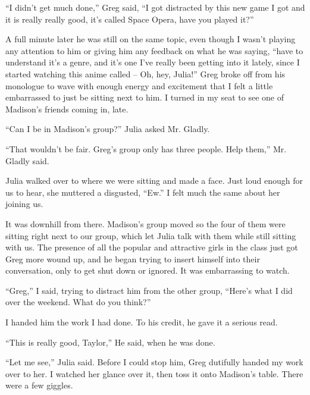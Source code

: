 ``I didn't get much done,'' Greg said, ``I got distracted by this new game I got and it is really really good, it's called Space Opera, have you played it?''



A full minute later he was still on the same topic, even though I wasn't playing any attention to him or giving him any feedback on what he was saying, ``\ldotsyou have to understand it's a genre, and it's one I've really been getting into it lately, since I started watching this anime called – Oh, hey, Julia!''  Greg broke off from his monologue to wave with enough energy and excitement that I felt a little embarrassed to just be sitting next to him.  I turned in my seat to see one of Madison's friends coming in, late.



``Can I be in Madison's group?'' Julia asked Mr. Gladly.



``That wouldn't be fair.  Greg's group only has three people.  Help them,'' Mr. Gladly said.



Julia walked over to where we were sitting and made a face.  Just loud enough for us to hear, she muttered a disgusted, ``Ew.''  I felt much the same about her joining us.



It was downhill from there.  Madison's group moved so the four of them were sitting right next to our group, which let Julia talk with them while still sitting with us.  The presence of all the popular and attractive girls in the class just got Greg more wound up, and he began trying to insert himself into their conversation, only to get shut down or ignored.  It was embarrassing to watch.



``Greg,'' I said, trying to distract him from the other group, ``Here's what I did over the weekend.  What do you think?''



I handed him the work I had done.  To his credit, he gave it a serious read.



``This is really good, Taylor,'' He said, when he was done.



``Let me see,'' Julia said.  Before I could stop him, Greg dutifully handed my work over to her.  I watched her glance over it, then toss it onto Madison's table.  There were a few giggles.



